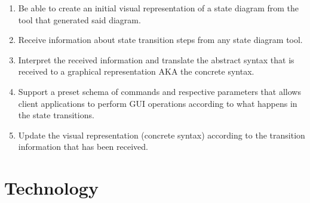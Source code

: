 \documentclass[11pt,a4paper,twocolumn]{article}
\begin{document}
\begin{enumerate}
	\item Be able to create an initial visual representation of a state diagram from the tool that generated said diagram.
	\item Receive information about state transition steps from any state diagram tool.
	\item Interpret the received information and translate the abstract syntax that is received to a graphical representation AKA the concrete syntax.
	\item Support a preset schema of commands and respective parameters that allows client applications to perform GUI operations according to what happens in the state transitions.
	\item Update the visual representation (concrete syntax) according to the transition information that has been received.
\end{enumerate}

\section{Technology}
\end{document}
